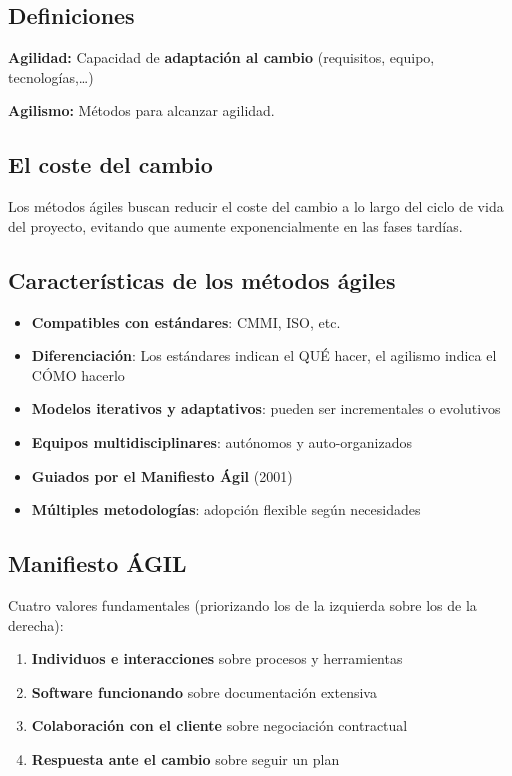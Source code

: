 \documentclass[a4paper,11pt]{report}
\begin{document}
 \subsection{Definiciones}
 \begin{definicion}
     \textbf{Agilidad:} Capacidad de \textbf{adaptación al cambio} (requisitos, equipo, tecnologías,…)
 \end{definicion}

\begin{definicion}
    \textbf{Agilismo:} Métodos para alcanzar agilidad.
\end{definicion}

\subsection{El coste del cambio}
Los métodos ágiles buscan reducir el coste del cambio a lo largo del ciclo de vida del proyecto, evitando que aumente exponencialmente en las fases tardías.

\subsection{Características de los métodos ágiles}

\begin{itemize}
    \item \textbf{Compatibles con estándares}: CMMI, ISO, etc.
    \item \textbf{Diferenciación}: Los estándares indican el QUÉ hacer, el agilismo indica el CÓMO hacerlo
    \item \textbf{Modelos iterativos y adaptativos}: pueden ser incrementales o evolutivos
    \item \textbf{Equipos multidisciplinares}: autónomos y auto-organizados
    \item \textbf{Guiados por el Manifiesto Ágil} (2001)
    \item \textbf{Múltiples metodologías}: adopción flexible según necesidades
\end{itemize}

\subsection{Manifiesto ÁGIL }

Cuatro valores fundamentales (priorizando los de la izquierda sobre los de la derecha):

\begin{enumerate}
    \item \textbf{Individuos e interacciones} sobre procesos y herramientas
    \item \textbf{Software funcionando} sobre documentación extensiva
    \item \textbf{Colaboración con el cliente} sobre negociación contractual
    \item \textbf{Respuesta ante el cambio} sobre seguir un plan
\end{enumerate}
\end{document}

